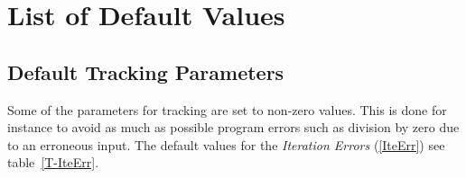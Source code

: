 \chapter{List of Default Values} \label{Default}

\section{Default Tracking Parameters} \label{DTP}

Some of the parameters for tracking are set to non-zero values.
This is done for instance to avoid as much as possible program errors such as division by zero due to an erroneous input.
The default values for the \textit{Iteration Errors} (\ref{IteErr}) see table~\ref{T-IteErr}.

 \setcounter{dtp}{0}

